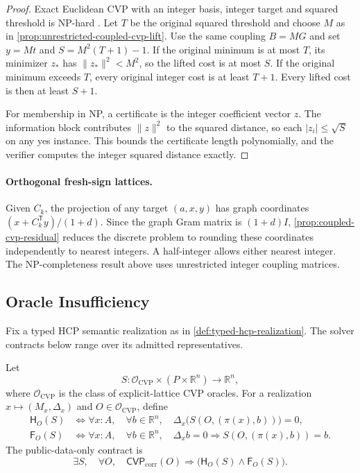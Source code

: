 \begin{proof}
Exact Euclidean CVP with an integer basis, integer target and squared
threshold is NP-hard \cite[\S3]{micciancio2001cvpp}. Let \(T\) be the original
squared threshold and choose \(M\) as in
\cref{prop:unrestricted-coupled-cvp-lift}. Use the same coupling \(B=MG\)
and set \(y=Mt\) and \(S=M^2(T+1)-1\). If the original minimum is at most
\(T\), its minimizer \(z_*\) has \(\|z_*\|^2<M^2\), so the lifted cost is at
most \(S\). If the original minimum exceeds \(T\), every original integer
cost is at least \(T+1\). Every lifted cost is then at least \(S+1\).

For membership in NP, a certificate is the integer coefficient vector
\(z\). The information block contributes \(\|z\|^2\) to the squared
distance, so each \(|z_i|\leq\sqrt S\) on any yes instance. This bounds
the certificate length polynomially, and the verifier computes the
integer squared distance exactly.
\end{proof}

\paragraph{Orthogonal fresh-sign lattices.}
Given \(C_k\), the projection of any target \((a,x,y)\) has graph coordinates
\((x+C_k^{\mathsf T}y)/(1+d)\). Since the graph Gram matrix is
\((1+d)I\), \cref{prop:coupled-cvp-residual} reduces the discrete problem
to rounding these coordinates independently to nearest integers. A
half-integer allows either nearest integer. The NP-completeness result
above uses unrestricted integer coupling matrices.

\subsection{Oracle Insufficiency}

Fix a typed HCP semantic realization as in \cref{def:typed-hcp-realization}.
The solver contracts below range over its admitted representatives.

\begin{definition}\label{def:public-hodge-solver-contract}
  Let
  \[
    S:\mathcal O_{\mathrm{CVP}}\times
      (P\times\mathbb R^n)\longrightarrow\mathbb R^n,
  \]
  where \(\mathcal O_{\mathrm{CVP}}\) is the class of explicit-lattice CVP
  oracles. For a realization \(x\mapsto(M_x,\Delta_x)\) and
  \(O\in\mathcal O_{\mathrm{CVP}}\), define
  \[
  \begin{aligned}
    \mathsf H_O(S)
    &\Longleftrightarrow
    \forall x:A,\quad
    \forall b\in\mathbb R^n,\quad
    \Delta_x\bigl(S(O,(\pi(x),b))\bigr)=0,\\
    \mathsf F_O(S)
    &\Longleftrightarrow
    \forall x:A,\quad
    \forall b\in\mathbb R^n,\quad
    \Delta_xb=0\Rightarrow S(O,(\pi(x),b))=b.
  \end{aligned}
  \]
  The public-data-only contract is
  \[
    \exists S,\quad
    \forall O,\quad
    \mathsf{CVP}_{\mathrm{corr}}(O)\Rightarrow
    \bigl(
      \mathsf H_O(S)
      \wedge
      \mathsf F_O(S)
    \bigr).
  \]
\end{definition}

